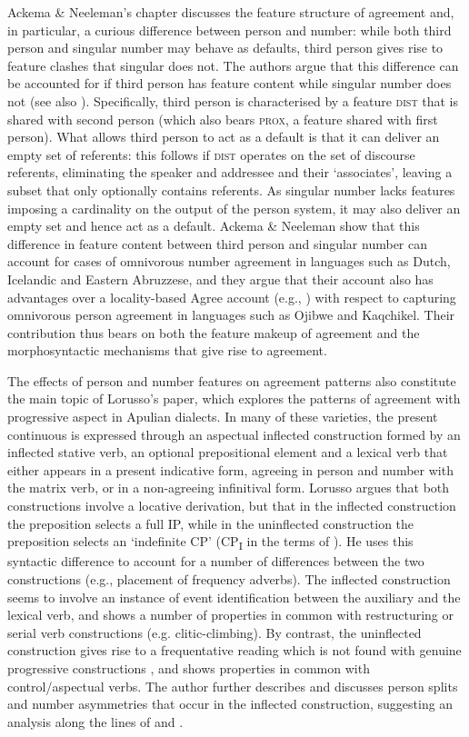 \documentclass[output=paper]{langsci/langscibook}
\begin{document}
Ackema \& Neeleman’s chapter discusses the feature structure of agreement and, in particular, a curious difference between person and number: while both third person and singular number may behave as defaults, third person gives rise to feature clashes that singular does not. The authors argue that this difference can be accounted for if third person has feature content while singular number does not (see also \citealt{Nevins2007,Nevins2011}). Specifically, third person is characterised by a feature \textsc{dist} that is shared with second person (which also bears \textsc{prox}, a feature shared with first person). What allows third person to act as a default is that it can deliver an empty set of referents: this follows if \textsc{dist} operates on the set of discourse referents, eliminating the speaker and addressee and their ‘associates’, leaving a subset that only optionally contains referents. As singular number lacks features imposing a cardinality on the output of the person system, it may also deliver an empty set and hence act as a default. Ackema \& Neeleman show that this difference in feature content between third person and singular number can account for cases of omnivorous number agreement in languages such as Dutch, Icelandic and Eastern Abruzzese, and they argue that their account also has advantages over a locality-based Agree account (e.g., \citealt{Preminger2014}) with respect to capturing omnivorous person agreement in languages such as Ojibwe and Kaqchikel. Their contribution thus bears on both the feature makeup of agreement and the morphosyntactic mechanisms that give rise to agreement.

The effects of person and number features on agreement patterns also constitute the main topic of Lorusso’s paper, which explores the patterns of agreement with progressive aspect in Apulian dialects. In many of these varieties, the present continuous is expressed through an aspectual inflected construction formed by an inflected stative verb, an optional prepositional element and a lexical verb that either appears in a present indicative form, agreeing in person and number with the matrix verb, or in a non-agreeing infinitival form. Lorusso argues that both constructions involve a locative derivation, but that in the inflected construction the preposition selects a full IP, while in the uninflected construction the preposition selects an ‘indefinite CP' (CP\textsubscript{I} in the terms of \citealt{Manzini2003}). He uses this syntactic difference to account for a number of differences between the two constructions (e.g., placement of frequency adverbs). The inflected construction seems to involve an instance of event identification \citep{Kratzer1996} between the auxiliary and the lexical verb, and shows a number of properties in common with restructuring or serial verb constructions (e.g. clitic-climbing). By contrast, the uninflected construction gives rise to a frequentative reading which is not found with genuine progressive constructions \citep{Chierchia1995}, and shows properties in common with control/aspectual verbs. The author further describes and discusses person splits and number asymmetries that occur in the inflected construction, suggesting an analysis along the lines of \citet{Bobalijk2008} and \citet{Manzini2007a,Manzini2011}.
\end{document}
